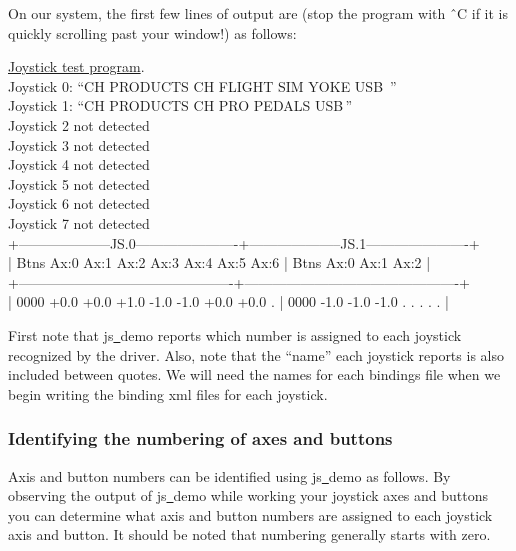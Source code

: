 On our system, the first few lines of output are (stop the program with \^{~}C if it is quickly scrolling  past your window!) as follows:
\medskip

\begin{ttfamily}
\tiny
\noindent
\underline{Joystick test program}.\\
Joystick 0: ``CH PRODUCTS CH FLIGHT SIM YOKE USB\, ''\\
Joystick 1: ``CH PRODUCTS CH PRO PEDALS USB\,''\\
Joystick 2 not detected\\
Joystick 3 not detected\\
Joystick 4 not detected\\
Joystick 5 not detected\\
Joystick 6 not detected\\
Joystick 7 not detected\\
+--------------------JS.0----------------------+--------------------JS.1----------------------+\\
| Btns Ax:0 Ax:1 Ax:2 Ax:3 Ax:4 Ax:5 Ax:6      | Btns Ax:0 Ax:1 Ax:2                          |\\
+----------------------------------------------+----------------------------------------------+\\
| 0000 +0.0 +0.0 +1.0 -1.0 -1.0 +0.0 +0.0   .  | 0000 -1.0 -1.0 -1.0   .    .    .    .    .  |\\
\end{ttfamily}

\noindent
First note that js\underline{~}demo reports which number is assigned to each joystick recognized by the driver.  Also, note that the ``name'' each joystick reports is also included between quotes.  We will need the names for each bindings file when we begin writing the binding xml files for each joystick.

\subsubsection{Identifying the numbering of axes and buttons\label{identifying}}
Axis and button numbers can be identified using js\underline{~}demo as follows. By observing the output of js\underline{~}demo while working your joystick axes and buttons you can determine what axis and button numbers are assigned to each joystick axis and button. It should be noted that numbering generally starts with zero.

